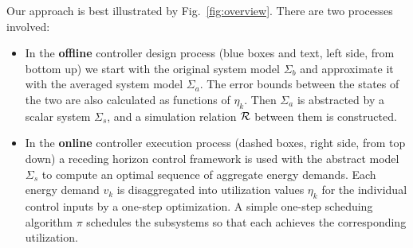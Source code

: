 Our approach is best illustrated by Fig.~\ref{fig:overview}.
There are two processes involved:
\begin{itemize}
\item In the \textbf{offline} controller design process (blue boxes and text, left side, from bottom
  up) we start with the original system model
  $\Sigma_b$ and approximate it with the averaged system model $\Sigma_a$. The
  error bounds between the states of the two are also calculated as functions
  of $\eta_k$. Then $\Sigma_a$ is abstracted by a scalar system $\Sigma_s$,
  and a simulation relation $\mathcal{R}$ between them is constructed.
  
\item In the \textbf{online} controller execution process (dashed
  boxes, right side, from top down) a receding horizon control
  framework is used with the abstract model $\Sigma_s$ to compute an
  optimal sequence of aggregate energy demands. Each energy demand
  $v_k$ is disaggregated into utilization values $\eta_k$ for the
  individual control inputs by a one-step optimization. A simple
  one-step scheduing algorithm $\pi$ schedules the subsystems so that
  each achieves the corresponding utilization.
\end{itemize}


